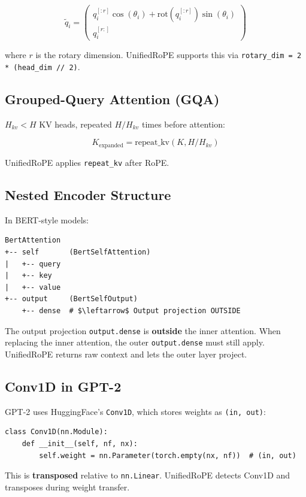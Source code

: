 \[
\tilde{q}_i = \begin{pmatrix} q_i^{[:r]} \cos(\theta_i) + \mathrm{rot}(q_i^{[:r]}) \sin(\theta_i) \\ q_i^{[r:]} \end{pmatrix}
\tag{3.6}
\]

where $r$ is the rotary dimension. UnifiedRoPE supports this via 
\texttt{rotary\_dim = 2 * (head\_dim // 2)}.

\subsection{Grouped-Query Attention (GQA)}

$H_{kv} < H$ KV heads, repeated $H / H_{kv}$ times before attention:

\[
K_\text{expanded} = \mathrm{repeat\_kv}(K, H / H_{kv})
\tag{3.7}
\]

UnifiedRoPE applies \texttt{repeat\_kv} after RoPE.

\subsection{Nested Encoder Structure}

In BERT-style models:

\begin{lstlisting}
BertAttention
+-- self       (BertSelfAttention)
|   +-- query
|   +-- key
|   +-- value
+-- output     (BertSelfOutput)
    +-- dense  # $\leftarrow$ Output projection OUTSIDE
\end{lstlisting}

The output projection \texttt{output.dense} is \textbf{outside} the inner attention. 
When replacing the inner attention, the outer \texttt{output.dense} must still 
apply. UnifiedRoPE returns raw context and lets the outer layer project.

\subsection{Conv1D in GPT-2}

GPT-2 uses HuggingFace's \texttt{Conv1D}, which stores weights as \texttt{(in, out)}:

\begin{lstlisting}
class Conv1D(nn.Module):
    def __init__(self, nf, nx):
        self.weight = nn.Parameter(torch.empty(nx, nf))  # (in, out)
\end{lstlisting}

This is \textbf{transposed} relative to \texttt{nn.Linear}. UnifiedRoPE detects Conv1D 
and transposes during weight transfer.

